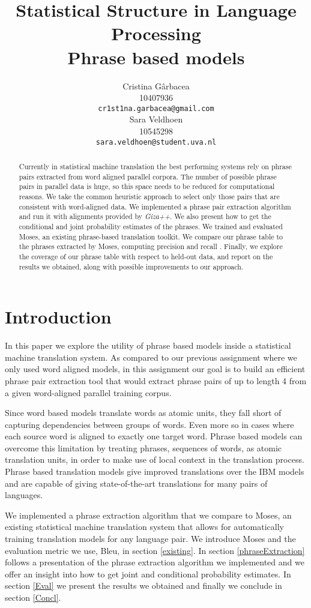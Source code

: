 \documentclass[11pt]{article}
\title{Statistical Structure in Language Processing \\ Phrase based models}
\author{ Cristina G\^arbacea\\
  10407936 \\
  {\small \tt cr1st1na.garbacea@gmail.com} 
  \\\And
  Sara Veldhoen \\
10545298   \\
  {\small \tt sara.veldhoen@student.uva.nl} \\}
\date{}
\begin{document}
\maketitle

\begin{abstract}
Currently in statistical machine translation the best performing systems rely on phrase pairs extracted from word aligned parallel corpora.
The number of possible phrase pairs in parallel data is huge, so this space needs to be reduced for computational reasons.
We take the common heuristic approach to select only those pairs that are consistent with word-aligned data. We implemented a phrase pair extraction algorithm and run it with alignments provided by \textit{Giza++}. We also present how to get the conditional and joint probability estimates of the phrases. 
We trained and evaluated Moses, an existing phrase-based translation toolkit. We compare our phrase table to the phrases extracted by Moses, computing precision and recall .
Finally, we explore the coverage of our phrase table with respect to held-out data, and report on the results we obtained, along with possible improvements to our approach.
\end{abstract}

\section{Introduction}
In this paper we explore the utility of phrase based models inside a statistical machine translation system. As compared to our previous assignment where we only used word aligned models, in this assignment our goal is to build an efficient phrase pair extraction tool that would extract phrase pairs of up to length 4 from a given word-aligned parallel training corpus. 

Since word based models translate words as atomic units, they fall short of capturing dependencies between groups of words. 
Even more so in cases where each source word is aligned to exactly one target word.
 Phrase based models can overcome this limitation by treating phrases, sequences of words, as atomic translation units, in order to make use of local context in the translation process. Phrase based translation models give improved translations over the IBM models and are capable of giving state-of-the-art translations for many pairs of languages.


We implemented a phrase extraction algorithm that we compare to Moses, an existing statistical machine translation system that allows for automatically training translation models for any language pair. We introduce Moses and the evaluation metric we use, Bleu, in section \ref{existing}. In section \ref{phraseExtraction} follows a presentation of the phrase extraction algorithm we implemented and we offer an insight into how to get joint and conditional probability estimates.
In section \ref{Eval} we present the results we obtained and finally we conclude in section \ref{Concl}.
\end{document}
